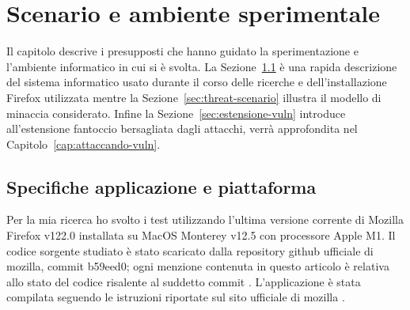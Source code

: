 \documentclass{sapthesis}
\newcommand{\Sezione}[1]{Sezione~\ref{#1}}
\newcommand{\Capitolo}[1]{Capitolo~\ref{#1}}
\begin{document}
\chapter{Scenario e ambiente sperimentale}
    Il capitolo descrive i presupposti che hanno guidato la sperimentazione e l'ambiente
    informatico in cui si è svolta. La \Sezione{sec:specifiche-e-piattaforma} è una rapida descrizione
    del sistema informatico usato durante il corso delle ricerche e dell'installazione
    Firefox utilizzata mentre la \Sezione{sec:threat-scenario} illustra il modello di minaccia
    considerato. Infine la \Sezione{sec:estensione-vuln} introduce all'estensione fantoccio 
    bersagliata dagli attacchi, verrà approfondita nel \Capitolo{cap:attaccando-vuln}.

    \section{Specifiche applicazione e piattaforma}
    \label{sec:specifiche-e-piattaforma}
        Per la mia ricerca ho svolto i test utilizzando l'ultima versione corrente di
        Mozilla Firefox v122.0 installata su MacOS Monterey v12.5 con processore Apple M1.
        Il codice sorgente studiato è stato scaricato dalla repository github ufficiale di mozilla,
        commit b59eed0; ogni menzione contenuta in questo articolo è relativa allo stato del codice
        risalente al suddetto commit \cite{mozilla-gecko-dev}. 
        L'applicazione è stata compilata seguendo le istruzioni riportate sul sito ufficiale di mozilla \cite{mozilla-build-firefox}.
\end{document}
